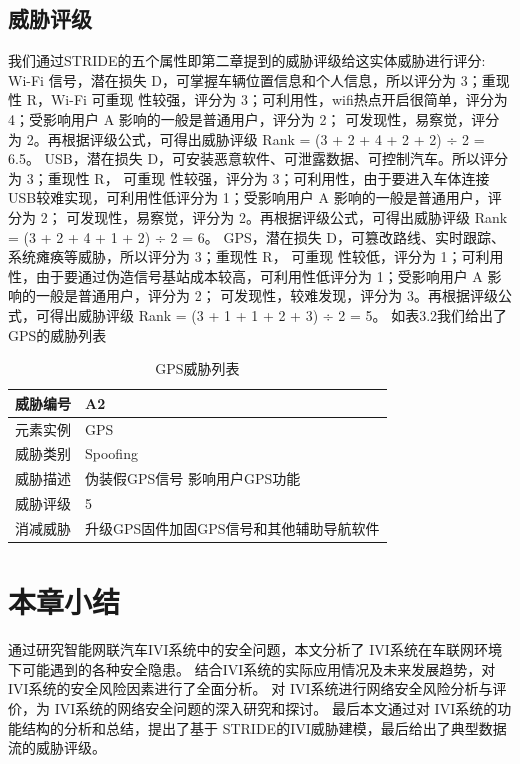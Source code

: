 \subsection{威胁评级}
我们通过STRIDE的五个属性即第二章提到的威胁评级给这实体威胁进行评分:
Wi-Fi 信号，潜在损失 D，可掌握车辆位置信息和个人信息，所以评分为 3；重现性 R，Wi-Fi 可重现
性较强，评分为 3；可利用性，wifi热点开启很简单，评分为 4；受影响用户 A 影响的一般是普通用户，评分为 2；
可发现性，易察觉，评分为 2。再根据评级公式，可得出威胁评级 Rank = (3 + 2 + 4 + 2 + 2) ÷ 2 = 6.5。
USB，潜在损失 D，可安装恶意软件、可泄露数据、可控制汽车。所以评分为 3；重现性 R， 可重现
性较强，评分为 3；可利用性，由于要进入车体连接USB较难实现，可利用性低评分为 1；受影响用户 A 影响的一般是普通用户，评分为 2；
可发现性，易察觉，评分为 2。再根据评级公式，可得出威胁评级 Rank = (3 + 2 + 4 + 1 + 2) ÷ 2 = 6。
GPS，潜在损失 D，可篡改路线、实时跟踪、系统瘫痪等威胁，所以评分为 3；重现性 R， 可重现
性较低，评分为 1；可利用性，由于要通过伪造信号基站成本较高，可利用性低评分为 1；受影响用户 A 影响的一般是普通用户，评分为 2；
可发现性，较难发现，评分为 3。再根据评级公式，可得出威胁评级 Rank = (3 + 1 + 1 + 2 + 3) ÷ 2 = 5。
如表3.2我们给出了GPS的威胁列表
\begin{table}
  \caption{GPS威胁列表}
\begin{center}
    \begin{tabular}{|l|l}
      \hline 威胁编号 & A2 \\
      \hline 元素实例 & GPS \\
      \hline 威胁类别 & Spoofing \\
      \hline 威胁描述 & 伪装假GPS信号 影响用户GPS功能 \\
      \hline 威胁评级 & 5 \\
      \hline 消减威胁 & 升级GPS固件加固GPS信号和其他辅助导航软件 \\
      \hline
      \end{tabular}
  \end{center}
\end{table}

\section{本章小结}
通过研究智能网联汽车IVI系统中的安全问题，本文分析了 IVI系统在车联网环境下可能遇到的各种安全隐患。
结合IVI系统的实际应用情况及未来发展趋势，对 IVI系统的安全风险因素进行了全面分析。
对 IVI系统进行网络安全风险分析与评价，为 IVI系统的网络安全问题的深入研究和探讨。
最后本文通过对 IVI系统的功能结构的分析和总结，提出了基于 STRIDE的IVI威胁建模，最后给出了典型数据流的威胁评级。
